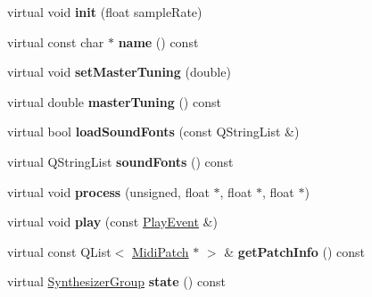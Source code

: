 \begin{DoxyCompactItemize}
\item 
\mbox{\label{class_aeolus_a31410e7798df6f1063bba1ad8151ced1}} 
virtual void {\bfseries init} (float sample\+Rate)
\item 
\mbox{\label{class_aeolus_ac4514e808ac3180ea602008c845806cf}} 
virtual const char $\ast$ {\bfseries name} () const
\item 
\mbox{\label{class_aeolus_acfccf204a18ed1b81ba34a726c4986a0}} 
virtual void {\bfseries set\+Master\+Tuning} (double)
\item 
\mbox{\label{class_aeolus_a41ad2735189303d764c0015cb37b8320}} 
virtual double {\bfseries master\+Tuning} () const
\item 
\mbox{\label{class_aeolus_a26a51cd3aeb6d8aadf9730954bc17b27}} 
virtual bool {\bfseries load\+Sound\+Fonts} (const Q\+String\+List \&)
\item 
\mbox{\label{class_aeolus_a4e3b42ee6b37a09b02973688529d541f}} 
virtual Q\+String\+List {\bfseries sound\+Fonts} () const
\item 
\mbox{\label{class_aeolus_a5c7bedbce524e30c64147e1c4334c8c0}} 
virtual void {\bfseries process} (unsigned, float $\ast$, float $\ast$, float $\ast$)
\item 
\mbox{\label{class_aeolus_ab89ab4df34d84ddb54e2523cd3f1d501}} 
virtual void {\bfseries play} (const \hyperlink{class_ms_1_1_play_event}{Play\+Event} \&)
\item 
\mbox{\label{class_aeolus_aed3b863a177a823b82ade887a7902241}} 
virtual const Q\+List$<$ \hyperlink{struct_ms_1_1_midi_patch}{Midi\+Patch} $\ast$ $>$ \& {\bfseries get\+Patch\+Info} () const
\item 
\mbox{\label{class_aeolus_a7d465faff2ddcef18a422f62621996a0}} 
virtual \hyperlink{class_ms_1_1_synthesizer_group}{Synthesizer\+Group} {\bfseries state} () const
\item 
\mbox{\label{class_aeolus_ad834285919e4a0ad920f8946e4819f77}} 

\end{DoxyCompactItemize}
